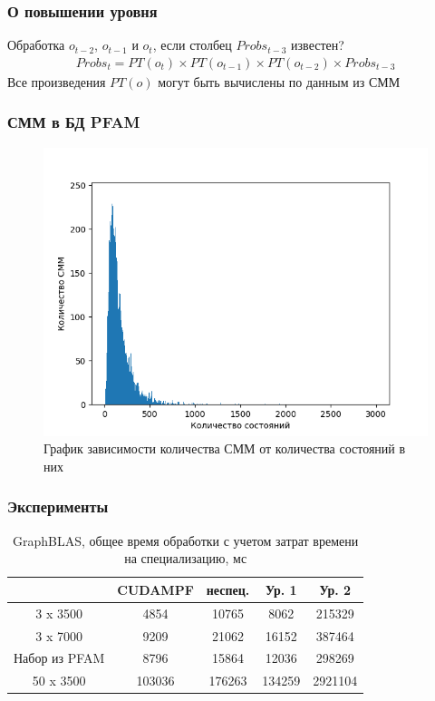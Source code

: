 \documentclass{beamer}
\newcommand\name[1]{\textsc{#1}}
\begin{document}
\begin{frame}
	\frametitle{О повышении уровня}
	Обработка $o_{t-2}$, $o_{t-1}$ и $o_t$, если столбец $Probs_{t-3}$ известен?
	\vfill
\begin{align}
  \mathit{Probs}_{t} = \mathit{PT}(o_t) \times \mathit{PT}(o_{t-1}) \times \mathit{PT}(o_{t-2}) \times \mathit{Probs}_{t - 3} 
\label{lvl_3}
\end{align}
	\vfill
	Все произведения $PT(o)$ могут быть вычислены по данным из СММ
\end{frame}

\begin{frame}
	\frametitle{СММ в БД PFAM}
\begin{figure}[h!]
  \centering
  \includegraphics[width=0.80\columnwidth]{../mean_HMM.png}
  \caption{График зависимости количества СММ от количества состояний в них}
  \label{HMM_mean}
\end{figure}
\end{frame}

\begin{frame}[fragile]
	\frametitle{Эксперименты}
\begin{table}[h!]
  \centering
  \begin{tabular}{||c c c c c||} 
    \hline
    & CUDAMPF & неспец. & Ур. 1 & Ур. 2 \\ [0.5ex] 
    \hline\hline
    3 x 3500 & 4854 & 10765 & 8062 & 215329 \\ 
    \hline
    3 x 7000 & 9209 & 21062 & 16152 & 387464 \\
    \hline
    Набор из \name{PFAM} & 8796 & 15864 & 12036 & 298269 \\
    \hline
    50 x 3500 & 103036 & 176263 & 134259 & 2921104 \\
    \hline
  \end{tabular}
  \caption{GraphBLAS, общее время обработки с учетом затрат времени на специализацию, мс}
  \label{runtime}
\end{table}
\end{frame}
\end{document}
